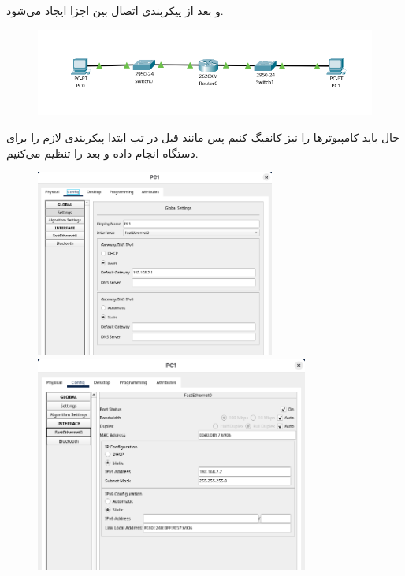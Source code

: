 و بعد از پیکربندی اتصال بین اجزا ایجاد می‌شود.
\begin{figure}[h]
    \centering
    \includegraphics[width=1\textwidth]{img/5.png}
\end{figure}

\clearpage
جال باید کامپیوترها را نیز کانفیگ کنیم پس مانند قبل در تب  ابتدا پیکربندی لازم را برای دستگاه انجام داده و بعد  را تنظیم می‌کنیم.
\begin{figure}[h]
    \centering
    \includegraphics[width=0.70\textwidth]{img/6.png}
    \includegraphics[width=0.8\textwidth]{img/7.png}
\end{figure}
\begin{figure}[h]
    \centering
\end{figure}
